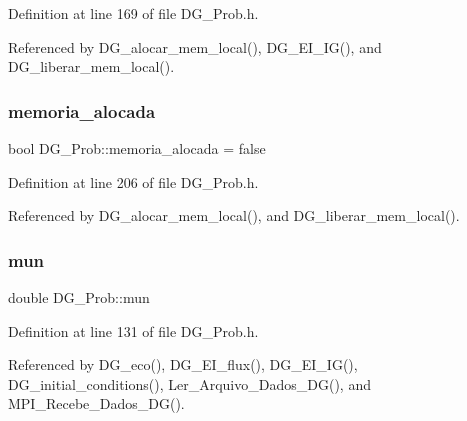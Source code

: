 Definition at line 169 of file D\+G\+\_\+\+Prob.\+h.



Referenced by D\+G\+\_\+alocar\+\_\+mem\+\_\+local(), D\+G\+\_\+\+E\+I\+\_\+\+I\+G(), and D\+G\+\_\+liberar\+\_\+mem\+\_\+local().

\mbox{\label{classDG__Prob_a834d65fdd0302355c89d3896433a7338}} 
\subsubsection{\texorpdfstring{memoria\+\_\+alocada}{memoria\_alocada}}
{\footnotesize\ttfamily bool D\+G\+\_\+\+Prob\+::memoria\+\_\+alocada = false\hspace{0.3cm}{\ttfamily [private]}}



Definition at line 206 of file D\+G\+\_\+\+Prob.\+h.



Referenced by D\+G\+\_\+alocar\+\_\+mem\+\_\+local(), and D\+G\+\_\+liberar\+\_\+mem\+\_\+local().

\mbox{\label{classDG__Prob_a5a78a8cf11b3dd9553a5f9385636610b}} 
\subsubsection{\texorpdfstring{mun}{mun}}
{\footnotesize\ttfamily double D\+G\+\_\+\+Prob\+::mun\hspace{0.3cm}{\ttfamily [private]}}



Definition at line 131 of file D\+G\+\_\+\+Prob.\+h.



Referenced by D\+G\+\_\+eco(), D\+G\+\_\+\+E\+I\+\_\+flux(), D\+G\+\_\+\+E\+I\+\_\+\+I\+G(), D\+G\+\_\+initial\+\_\+conditions(), Ler\+\_\+\+Arquivo\+\_\+\+Dados\+\_\+\+D\+G(), and M\+P\+I\+\_\+\+Recebe\+\_\+\+Dados\+\_\+\+D\+G().

\mbox{\label{classDG__Prob_af0f93772b9aec2a1500a1443d2dc7a00}} 
